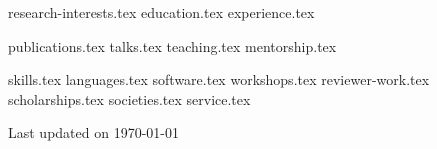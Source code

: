 \documentclass[letterpaper,13pt]{article}
\newcommand{\updateinfo}[1][\today]{\par\vfill\hfill{\normalsize\color{MidnightBlue}Last
    updated on #1}}
\begin{document}


{research-interests.tex}
{education.tex}
{experience.tex}

\pagebreak

{publications.tex}
{talks.tex}
{teaching.tex}
{mentorship.tex}

\pagebreak

\sidebyside
    {{skills.tex}}
    {{languages.tex}}
{software.tex}
{workshops.tex}
{reviewer-work.tex}
{scholarships.tex}
{societies.tex}
{service.tex}

\updateinfo
\end{document}
